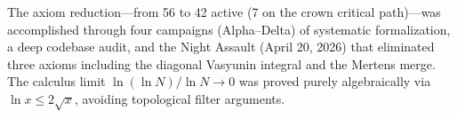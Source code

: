 \documentclass[12pt,a4paper]{article}
\begin{document}
The axiom reduction---from 56 to 42 active (7 on the crown critical path)---was
accomplished through four campaigns (Alpha--Delta) of systematic formalization,
a deep codebase audit, and the Night Assault (April 20, 2026) that eliminated
three axioms including the diagonal Vasyunin integral and the Mertens merge.
The calculus limit $\ln(\ln N)/\ln N \to 0$ was proved purely algebraically
via $\ln x \le 2\sqrt{x}$, avoiding topological filter arguments.
\end{document}
